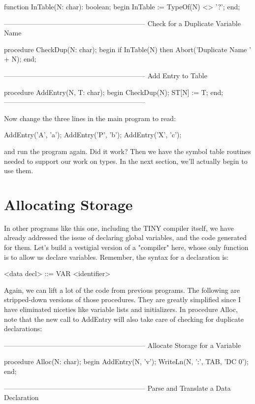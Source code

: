 \documentclass[float=false, crop=false]{standalone}
\begin{document}
function InTable(N: char): boolean;
begin
   InTable := TypeOf(N) <> '?';
end;


{--------------------------------------------------------------}
{ Check for a Duplicate Variable Name }

procedure CheckDup(N: char);
begin
   if InTable(N) then Abort('Duplicate Name ' + N);
end;


{--------------------------------------------------------------}
{ Add Entry to Table }

procedure AddEntry(N, T: char);
begin
   CheckDup(N);
   ST[N] := T;
end;
{--------------------------------------------------------------}


Now change the three lines in the main program to read:


     AddEntry('A', 'a');
     AddEntry('P', 'b');
     AddEntry('X', 'c');


and run the program again. Did it work? Then we have the symbol table routines
needed to support our work on types. In the next section, we'll actually begin
to use them.


\section{Allocating Storage}

In other programs like this one, including the TINY compiler itself, we have
already addressed the issue of declaring global variables, and the code
generated for them. Let's build a vestigial version of a "compiler" here, whose
only function is to allow us declare variables. Remember, the syntax for a
declaration is:


     <data decl> ::= VAR <identifier>


Again, we can lift a lot of the code from previous programs. The following are
stripped-down versions of those procedures. They are greatly simplified since I
have eliminated niceties like variable lists and initializers. In procedure
Alloc, note that the new call to AddEntry will also take care of checking for
duplicate declarations:


{--------------------------------------------------------------}
{ Allocate Storage for a Variable }

procedure Alloc(N: char);
begin
   AddEntry(N, 'v');
   WriteLn(N, ':', TAB, 'DC 0');
end;


{--------------------------------------------------------------}
{ Parse and Translate a Data Declaration }
\end{document}
